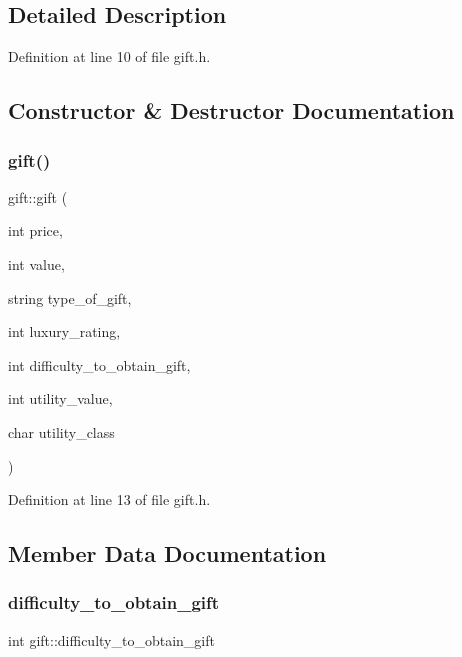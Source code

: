 \subsection{Detailed Description}


Definition at line 10 of file gift.\+h.



\subsection{Constructor \& Destructor Documentation}
\mbox{\label{classgift_a63b728ae46adca610d41cad4f66b8b24}} 
\subsubsection{\texorpdfstring{gift()}{gift()}}
{\footnotesize\ttfamily gift\+::gift (\begin{DoxyParamCaption}\item[{int}]{price,  }\item[{int}]{value,  }\item[{string}]{type\+\_\+of\+\_\+gift,  }\item[{int}]{luxury\+\_\+rating,  }\item[{int}]{difficulty\+\_\+to\+\_\+obtain\+\_\+gift,  }\item[{int}]{utility\+\_\+value,  }\item[{char}]{utility\+\_\+class }\end{DoxyParamCaption})\hspace{0.3cm}{\ttfamily [inline]}}



Definition at line 13 of file gift.\+h.



\subsection{Member Data Documentation}
\mbox{\label{classgift_af1320e49b31139686edbcd0b7c262c00}} 
\subsubsection{\texorpdfstring{difficulty\+\_\+to\+\_\+obtain\+\_\+gift}{difficulty\_to\_obtain\_gift}}
{\footnotesize\ttfamily int gift\+::difficulty\+\_\+to\+\_\+obtain\+\_\+gift}




